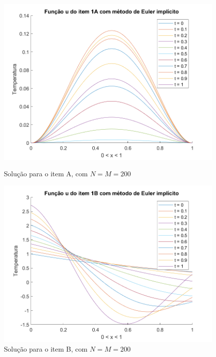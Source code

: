 \documentclass[12pt]{article}
\begin{document}
\begin{spacing}{1.5}
\begin{figure}[ht!]
\centering
    \begin{minipage}[b]{0.45\linewidth}
    \includegraphics[width=1\linewidth]{Segunda_Tarefa/ItemB/itemA_2D.png}
    \caption{Solução para o item A, com $N=M=200$}
    \label{fig:Tarefa2B_itemA_2D}
\end{minipage}
\quad
\begin{minipage}[b]{0.45\linewidth}
    \includegraphics[width=1\linewidth]{Segunda_Tarefa/ItemB/itemB_2D.png}
    \caption{Solução para o item B, com $N=M=200$}
    \label{fig:Tarefa2B_itemB_2D}
\end{minipage}
\end{figure} 


\end{spacing}
\end{document}
